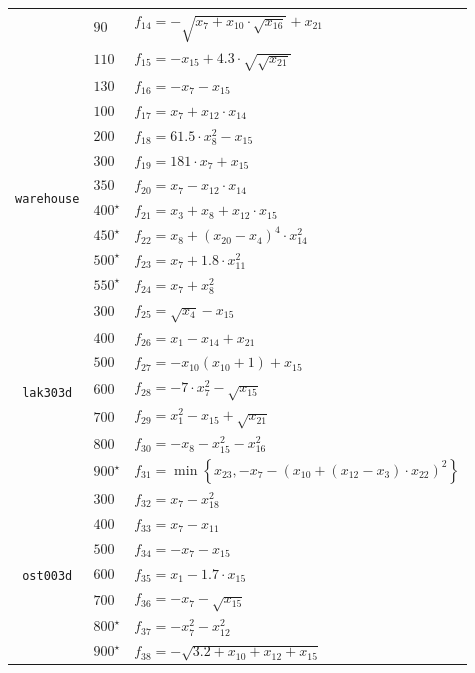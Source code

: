 \documentclass[letterpaper]{article}
\begin{document}
\begin{table}[t!]
{\begin{adjustbox}{width=0.08\columnwidth}
\begin{tabular}{c|l|l}
& $ 90 $ & $ f_{14} = - \sqrt{x_{7} + x_{10} \cdot \sqrt{x_{16}}} + x_{21} $ \\
& $ 110 $ & $ f_{15} = - x_{15} + 4.3 \cdot \sqrt{\sqrt{x_{21}}} $ \\
& $ 130 $ & $ f_{16} = - x_{7} - x_{15} $ \\
\hline
\multirow{8}{*}{\begin{turn}{90} {\tt warehouse} \end{turn}}
& $ 100 $ & $ f_{17} = x_{7} + x_{12} \cdot x_{14} $ \\
& $ 200 $ & $ f_{18} = 61.5 \cdot x_{8}^2 - x_{15} $ \\
& $ 300 $ & $ f_{19} = 181 \cdot x_{7} + x_{15} $ \\
& $ 350 $ & $ f_{20} = x_{7} - x_{12} \cdot x_{14} $ \\
& $ 400^\star $ & $ f_{21} = x_{3} + x_{8} + x_{12} \cdot x_{15} $ \\
& $ 450^\star $ & $ f_{22} = x_{8} + \left(x_{20} - x_{4}\right)^4 \cdot x_{14}^2 $ \\
& $ 500^\star $ & $ f_{23} = x_{7} + 1.8 \cdot x_{11}^2 $ \\
& $ 550^\star $ & $ f_{24} = x_{7} + x_{8}^2 $ \\
\hline
\multirow{7}{*}{\begin{turn}{90} {\tt lak303d} \end{turn}}
& $ 300 $ & $ f_{25} = \sqrt{x_{4}} - x_{15} $ \\
& $ 400 $ & $ f_{26} = x_{1} - x_{14} + x_{21} $ \\
& $ 500 $ & $ f_{27} = - x_{10}(x_{10} + 1) + x_{15} $ \\
& $ 600 $ & $ f_{28} = - 7 \cdot x_{7}^2 - \sqrt{x_{15}} $ \\
& $ 700 $ & $ f_{29} = x_{1}^2 - x_{15} + \sqrt{x_{21}} $ \\
& $ 800 $ & $ f_{30} = -x_{8} - x_{15}^2 - x_{16}^2 $ \\
& $ 900^\star $ & $ f_{31} = \min\left\{x_{23}, -x_{7} - \left(x_{10} + \left(x_{12} - x_{3}\right) \cdot x_{22}\right)^2\right\} $ \\
\hline
\multirow{7}{*}{\begin{turn}{90} {\tt ost003d} \end{turn}}
& $ 300 $ & $ f_{32} = x_{7} - x_{18}^2 $ \\
& $ 400 $ & $ f_{33} = x_{7} - x_{11} $ \\
& $ 500 $ & $ f_{34} = -x_{7} - x_{15} $ \\
& $ 600 $ & $ f_{35} = x_{1} - 1.7 \cdot x_{15} $ \\
& $ 700 $ & $ f_{36} = -x_{7} -\sqrt{x_{15}} $ \\
& $ 800^\star $ & $ f_{37} = - x_{7}^2 - x_{12}^2 $ \\
& $ 900^\star $ & $ f_{38} = -\sqrt{3.2 + x_{10} + x_{12} + x_{15}} $ \\ \bottomrule
\end{tabular}
\end{adjustbox}}
\end{table}
\end{document}
